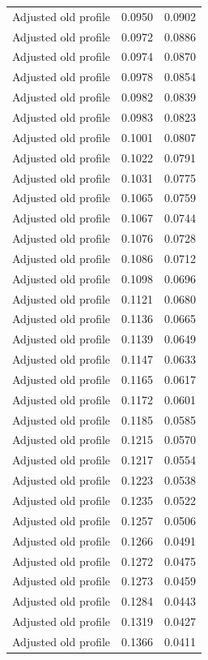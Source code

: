\begin{table}[htbp]
\begin{tabular}{lll}
Adjusted old profile & 0.0950 & 0.0902 \\
Adjusted old profile & 0.0972 & 0.0886 \\
Adjusted old profile & 0.0974 & 0.0870 \\
Adjusted old profile & 0.0978 & 0.0854 \\
Adjusted old profile & 0.0982 & 0.0839 \\
Adjusted old profile & 0.0983 & 0.0823 \\
Adjusted old profile & 0.1001 & 0.0807 \\
Adjusted old profile & 0.1022 & 0.0791 \\
Adjusted old profile & 0.1031 & 0.0775 \\
Adjusted old profile & 0.1065 & 0.0759 \\
Adjusted old profile & 0.1067 & 0.0744 \\
Adjusted old profile & 0.1076 & 0.0728 \\
Adjusted old profile & 0.1086 & 0.0712 \\
Adjusted old profile & 0.1098 & 0.0696 \\
Adjusted old profile & 0.1121 & 0.0680 \\
Adjusted old profile & 0.1136 & 0.0665 \\
Adjusted old profile & 0.1139 & 0.0649 \\
Adjusted old profile & 0.1147 & 0.0633 \\
Adjusted old profile & 0.1165 & 0.0617 \\
Adjusted old profile & 0.1172 & 0.0601 \\
Adjusted old profile & 0.1185 & 0.0585 \\
Adjusted old profile & 0.1215 & 0.0570 \\
Adjusted old profile & 0.1217 & 0.0554 \\
Adjusted old profile & 0.1223 & 0.0538 \\
Adjusted old profile & 0.1235 & 0.0522 \\
Adjusted old profile & 0.1257 & 0.0506 \\
Adjusted old profile & 0.1266 & 0.0491 \\
Adjusted old profile & 0.1272 & 0.0475 \\
Adjusted old profile & 0.1273 & 0.0459 \\
Adjusted old profile & 0.1284 & 0.0443 \\
Adjusted old profile & 0.1319 & 0.0427 \\
Adjusted old profile & 0.1366 & 0.0411 \\

\end{tabular}
\end{table}
